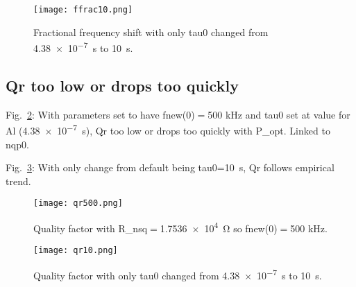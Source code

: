 \documentclass[12pt]{article}
\begin{document}
\begin{figure}[htbp]
\begin{center}
\texttt{[image: ffrac10.png]}
\caption{Fractional frequency shift with only tau0 changed from \SI{4.38e-7}{s} to \SI{10}{s}.}
\label{fig:ffrac10}
\end{center}
\end{figure}

\subsection{Qr too low or drops too quickly}
Fig.~\ref{fig:qr500}: With parameters set to have fnew(0)$=$500 kHz and tau0 set at value for Al (\SI{4.38e-7}{s}), Qr too low or drops too quickly with P\_opt. Linked to nqp0.

Fig.~\ref{fig:qr10}: With only change from default being tau0=\SI{10}{s}, Qr follows empirical trend.

\begin{figure}[htbp]
\begin{center}
\texttt{[image: qr500.png]}
\caption{Quality factor with R\_nsq$=$\SI{1.7536e4}{\ohm} so fnew(0)$=$500 kHz.}
\label{fig:qr500}
\end{center}
\end{figure}

\begin{figure}[htbp]
\begin{center}
\texttt{[image: qr10.png]}
\caption{Quality factor with only tau0 changed from \SI{4.38e-7}{s} to \SI{10}{s}.}
\label{fig:qr10}
\end{center}
\end{figure}

\newpage
\end{document}
